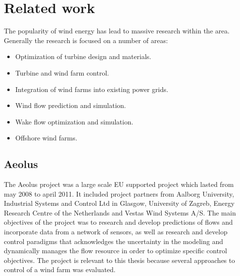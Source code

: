 \chapter{Related work}
The popularity of wind energy has lead to massive research within the area. Generally the research is focused on a number of areas:

\begin{itemize}
	\item Optimization of turbine design and materials.
	\item Turbine and wind farm control.
	\item Integration of wind farms into existing power grids.
	\item Wind flow prediction and simulation.
	\item Wake flow optimization and simulation.
	\item Offshore wind farms.
\end{itemize}

%

\section{Aeolus}
The Aeolus project was a large scale EU supported project which lasted from may 2008 to april 2011. It included project partners from 
Aalborg University, Industrial Systems and Control Ltd in Glasgow, University of Zagreb, Energy Research Centre of the Netherlands and Vestas Wind Systems A/S.
The main objectives of the project was to research and develop predictions of flows and incorporate data from a network of sensors, as well as research and develop control paradigms that acknowledges the uncertainty in the modeling and dynamically manages the flow resource in order to optimize specific control objectives.
The project is relevant to this thesis because several approaches to control of a wind farm was evaluated.

